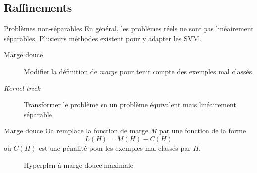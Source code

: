 \documentclass[hyperref={unicode}, xcolor={svgnames}, french]{beamer}
\begin{document}

\subsection{Raffinements}
\begin{frame}{Problèmes non-séparables}
    En général, les problèmes réels ne sont pas linéairement séparables.
    Plusieurs méthodes existent pour y adapter les SVM.
    \begin{description}
        \item[Marge douce] Modifier la définition de \emph{marge} pour tenir compte des exemples mal classés
        \item[\emph{Kernel trick}] Transformer le problème en un problème équivalent mais linéairement séparable
    \end{description}
\end{frame}

\begin{frame}{Marge douce}
    On remplace la fonction de marge $M$ par une fonction de la forme
    \begin{equation}
        L(H) = M(H) - C(H)
    \end{equation}
    où $C(H)$ est une pénalité pour les exemples mal classés par $H$.
    \begin{figure}
        \tikzset{external/export=true}
        \caption{Hyperplan à marge douce maximale}
    \end{figure}
\end{frame}
\end{document}
